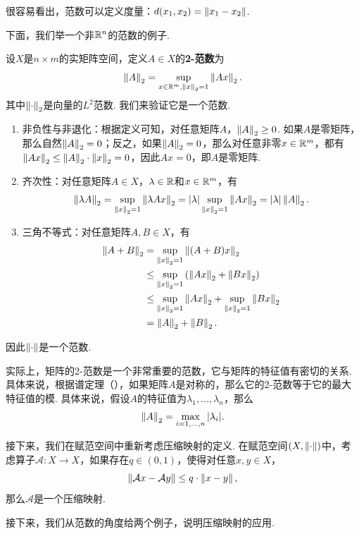 很容易看出，范数可以定义度量：$d(x_1,x_2)=\left\|x_1-x_2\right\|$.

下面，我们举一个非$\mathbb{R}^n$的范数的例子.

\begin{example}[矩阵范数]\label{example:matrix-norm}
    设$X$是$n\times m$的实矩阵空间，定义$A\in X$的\textbf{2-范数}为
    \[\left\|A\right\|_2=\sup_{x\in\mathbb{R}^m,\left\|x\right\|_2=1}\left\|Ax\right\|_2.\]
    其中$\left\|\cdot\right\|_2$是向量的$L^2$范数. 我们来验证它是一个范数.

    \begin{enumerate}
        \item 非负性与非退化：根据定义可知，对任意矩阵$A$，$\left\|A\right\|_2\geq 0$. 如果$A$是零矩阵，那么自然$\left\|A\right\|_2=0$；反之，如果$\left\|A\right\|_2=0$，那么对任意非零$x\in\mathbb{R}^m$，都有$\left\|Ax\right\|_2\leq \left\|A\right\|_2\cdot\left\|x\right\|_2=0$，因此$Ax=0$，即$A$是零矩阵.
        \item 齐次性：对任意矩阵$A\in X$，$\lambda\in\mathbb{R}$和$x\in \mathbb{R}^m$，有
        \[\left\|\lambda A\right\|_2=\sup_{\left\|x\right\|_2=1}\left\|\lambda Ax\right\|_2=|\lambda|\sup_{\left\|x\right\|_2=1}\left\|Ax\right\|_2=|\lambda|\left\|A\right\|_2.\]
        \item 三角不等式：对任意矩阵$A,B\in X$，有
        \begin{align*}
            \left\|A+B\right\|_2&=\sup_{\left\|x\right\|_2=1}\left\|(A+B)x\right\|_2\\
            &\leq \sup_{\left\|x\right\|_2=1}\left(\left\|Ax\right\|_2+\left\|Bx\right\|_2\right)\\
            &\leq \sup_{\left\|x\right\|_2=1}\left\|Ax\right\|_2+\sup_{\left\|x\right\|_2=1}\left\|Bx\right\|_2\\
            &=\left\|A\right\|_2+\left\|B\right\|_2.
        \end{align*}
    \end{enumerate}
    因此$\left\|\cdot\right\|$是一个范数.

    实际上，矩阵的2-范数是一个非常重要的范数，它与矩阵的特征值有密切的关系. 具体来说，根据谱定理（），如果矩阵$A$是对称的，那么它的2-范数等于它的最大特征值的模. 具体来说，假设$A$的特征值为$\lambda_1,\dots,\lambda_n$，那么
    \[\left\|A\right\|_2=\max_{i=1,\dots,n}|\lambda_i|.\]
\end{example}

接下来，我们在赋范空间中重新考虑压缩映射的定义. 在赋范空间$(X,\left\|\cdot\right\|)$中，考虑算子$\mathcal A:X\to X$，如果存在$q\in(0,1)$，使得对任意$x,y\in X$，
\[\left\|\mathcal A x - \mathcal A y\right\|\leq q\cdot \left\|x-y\right\|,\]
那么$\mathcal A$是一个压缩映射.

接下来，我们从范数的角度给两个例子，说明压缩映射的应用.


